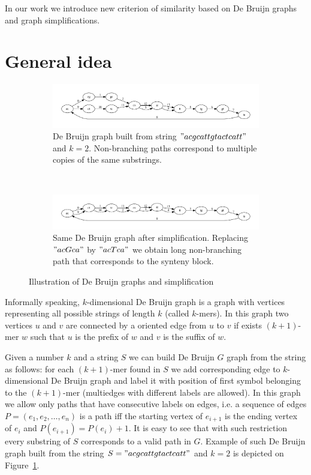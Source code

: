\documentclass[a4paper,12pt]{scrartcl}
\begin{document}
In our work we introduce new criterion of similarity based on De Bruijn graphs and graph simplifications.

\section{General idea}

\begin{figure}
        \begin{subfigure}[a]{1\textwidth}
		\includegraphics[scale = 0.40]{graph1.pdf}
		\small \caption{De Bruijn graph built from string \("acgcattgtactcatt"\) and \(k = 2\). Non-branching paths correspond to multiple
			copies of the same substrings.}
		\label{DeBruijnA}
        \end{subfigure}
	\\
        \begin{subfigure}[b]{1\textwidth}
		\includegraphics[scale = 0.40]{graph2.pdf}
		\small \caption{Same De Bruijn graph after simplification. Replacing \("acGca"\) by \("acTca"\) we obtain long non-branching path
			that corresponds to the synteny block.}
		\label{DeBruijnB}
        \end{subfigure}
	\small \caption{Illustration of De Bruijn graphs and simplification}
\end{figure}

Informally speaking, \(k\)-dimensional De Bruijn graph is a graph with vertices representing all possible strings of length \(k\)
(called \(k\)-mers). In this graph two vertices \(u\) and \(v\) are connected by a oriented edge from \(u\) to \(v\) if exists
\((k + 1)\)-mer \(w\) such that \(u\) is the prefix of \(w\) and \(v\) is the suffix of \(w\).

Given  a number \(k\) and a string \(S\) we can build De Bruijn \(G\) graph from the string as follows: for each \((k + 1)\)-mer found 
in \(S\) we add corresponding edge to \(k\)-dimensional De Bruijn graph and label it with position of first symbol belonging to
the \((k + 1)\)-mer (multiedges with different labels are allowed). In this graph we allow only paths that have consecutive labels
on edges, i.e. a sequence of edges \(P = (e_{1}, e_{2}, \ldots, e_{n})\) is a path iff the starting vertex of \(e_{i + 1}\) is the ending
vertex of \(e_{i}\) and \(P(e_{i+1}) = P(e_{i}) + 1\). It is easy to see that with such restriction every substring of \(S\) corresponds
to a valid path in \(G\). Example of such De Bruijn graph built from the string \(S = "acgcattgtactcatt" \) and \(k = 2\) is depicted on 
Figure~\ref{DeBruijnA}.
\end{document}
